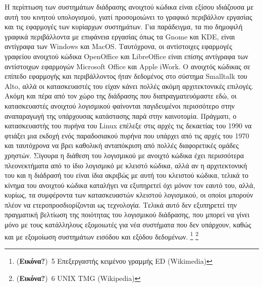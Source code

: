 \documentclass[
]{article}
\begin{document}
Η περίπτωση των συστημάτων διάδρασης ανοιχτού κώδικα είναι εξίσου
ιδιάζουσα με αυτή του κινητού υπολογισμού, γιατί προσομοιώνει το γραφικό
περιβάλλον εργασίας και τις εφαρμογές των κυρίαρχων συστημάτων. Για
παράδειγμα, τα πιο δημοφιλή γραφικά περιβάλλοντα με επιφάνεια εργασίας
όπως τα Gnome και KDE, είναι αντίγραφα των Windows και MacOS.
Ταυτόχρονα, οι αντίστοιχες εφαρμογές γραφείου ανοιχτού κώδικα OpenOffice
και LibreOffice είναι επίσης αντίγραφα των αντίστοιχων εφαρμογών
Microsoft Office και Apple iWork. Ο ανοιχτός κώδικας σε επίπεδο
εφαρμογής και περιβάλλοντος ήταν δεδομένος στο σύστημα Smalltalk του
Alto, αλλά οι κατασκευαστές του είχαν κάνει πολλές ακόμη αρχιτεκτονικές
επιλογές. Ακόμη και πέρα από τον χώρο της διάδρασης που
διαπραγματευόμαστε εδώ, οι κατασκευαστές ανοιχτού λογισμικού φαίνονται
παγιδευμένοι περισσότερο στην αναπαραγωγή της υπάρχουσας κατάστασης παρά
στην καινοτομία. Πράγματι, ο κατασκευαστής του πυρήνα του Linux επέλεξε
στις αρχές τις δεκαετίας του 1990 να φτιάξει μια εκδοχή ενός
παραδοσιακού πυρήνα που υπάρχει από τις αρχές του 1970 και ταυτόχρονα να
βρει καθολική ανταπόκριση από πολλές διαφορετικές ομάδες χρηστών.
Σίγουρα η διάθεση του λογισμικού με ανοιχτό κώδικα έχει περισσότερα
πλεονεκτήματα από το ίδιο λογισμικό με κλειστό κώδικα, αλλά αν η
αρχιτεκτονική του και η διάδρασή του είναι ίδια ακριβώς με αυτή του
κλειστού κώδικα, τελικά το κίνημα του ανοιχτού κώδικα καταλήγει να
εξυπηρετεί όχι μόνον τον εαυτό του, αλλά, κυρίως, τα συμφέροντα των
κατασκευαστών κλειστού λογισμικού, οι οποίοι μπορούν πλέον να
ετεροπροσδιορίζονται ως τεχνολογία. Τελικά αυτό δεν εξυπηρετεί την
πραγματική βελτίωση της ποιότητας του λογισμικού διάδρασης, που μπορεί
να γίνει μόνο με τους κατάλληλους εξομοιωτές για νέα συστήματα που δεν
υπάρχουν, καθώς και με εξομοίωση συστημάτων εισόδου και εξόδου
δεδομένων. \footnote{(\textbf{Εικόνα?})~5 Επεξεργαστής κειμένου γραμμής
  ED (Wikimedia)} \footnote{(\textbf{Εικόνα?})~6 UNIX TMG (Wikipedia)}
\end{document}
